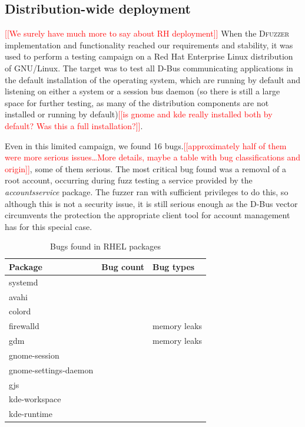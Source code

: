 \documentclass[conference]{IEEEtran}
\newcommand{\addtodo}[1]{\textcolor{red}{[[#1]]}}
\begin{document}
\subsection{Distribution-wide deployment}
\addtodo{We surely have much more to say about RH deployment}
When the \textsc{Dfuzzer} implementation and functionality reached our requirements
and stability, it was used to perform a testing campaign on a Red Hat Enterprise
Linux distribution of GNU/Linux. The target was to test all D-Bus communicating
applications in the default installation of the operating system, which are
running by default and listening on either a system or a session bus
daemon (so there is still a large space for further testing, as many of the
distribution components are not installed or running by default)\addtodo{is
gnome and kde really installed both by default? Was this a full installation?}.

Even in this limited campaign, we found 16 bugs.\addtodo{approximately half of
them were more serious issues\ldots More details, maybe a table with bug
classifications and origin}, some of them serious. The most critical bug found
was a removal of a root account, occurring during fuzz testing a service
provided by the \emph{accountsservice} package. The fuzzer ran with sufficient
privileges to do this, so although this is not a security issue, it
is still serious enough as the D-Bus vector circumvents the protection the
appropriate client tool for account management has for this special case.

\FloatBarrier
\begin{table}[!h]
\caption{Bugs found in RHEL packages}
\label{tab:foundbugs}
\begin{center}
	\begin{tabular}{|l|c|l|}
	\hline
	\textbf{Package} & \textbf{Bug count} & \textbf{Bug types} \\ \hline \hline
	systemd & & \\ \hline
	avahi & & \\ \hline
	colord & & \\ \hline
	firewalld & & memory leaks \\ \hline
	gdm & & memory leaks \\ \hline
	gnome-session & & \\ \hline
	gnome-settings-daemon & & \\ \hline
	gjs & & \\ \hline
	kde-workspace & & \\ \hline
	kde-runtime & & \\ \hline
	\end{tabular}
\end{center}
\end{table}
\FloatBarrier
\end{document}
